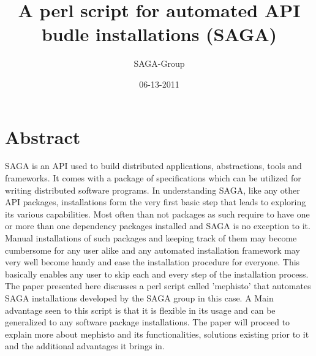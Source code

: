 \documentclass[a4paper,10pt]{article}
\newcommand{\jhanote}[1]{  {\textcolor{red}     { ***Shantenu: #1 }}}
\newcommand{\jhanote}[1]{}
\begin{document}
 \title{ \Large \vspace{-3.5em} A perl script for automated API budle installations (SAGA)}
 
 \author{\normalsize SAGA-Group}
 \date{\normalsize 06-13-2011}
 \maketitle
 




\section*{\normalsize Abstract}
SAGA is an API used to build distributed applications, abstractions, tools and frameworks. 
It comes with a package of specifications which can be utilized for writing distributed software programs. 
In understanding SAGA, like any other API packages, installations form the very first basic step that leads 
to exploring its various capabilities. Most often than not packages as such require to have one or more than 
one dependency packages installed and SAGA is no exception to it. Manual installations of such packages 
and keeping track of them may become cumbersome for any user alike and any automated installation framework 
may very well become handy and ease the installation procedure for everyone. This basically enables any user 
to skip each and every step of the installation process. The paper presented here discusses a perl script called 'mephisto' 
that automates SAGA installations developed by the SAGA group in this case. A Main advantage seen to this script is that it is
flexible in its usage and can be generalized to any software package installations. The paper will proceed to explain more 
about mephisto and its functionalities, solutions existing prior to it and the additional advantages it brings in.
%  
%
\end{document}
